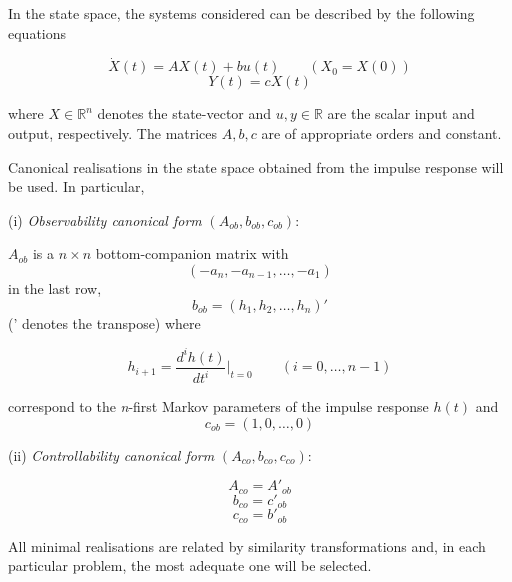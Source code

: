 \documentclass{article}
\begin{document}
In the state space, the systems considered can be described by the
following equations

\begin{equation*}
\dot{X}(t) = AX(t) + bu(t) \qquad (X_0 = X(0))
\end{equation*}
\begin{equation}\label{eq:3}
Y(t) = c X(t)
\end{equation}

where $X \in \mathbb{R}^n$ denotes the state-vector and $u, y \in
\mathbb{R}$ are the scalar input and output, respectively. The
matrices $A, b, c$ are of appropriate orders and constant.

Canonical realisations in the state space obtained from the
impulse response will be used. In particular,

(i) \textit{Observability canonical form} $(A_{ob}, b_{ob},
c_{ob})$:

$A_{ob}$ is a $n \times n$ bottom-companion matrix with
\begin{equation}\label{eq:4}
(-a_n,-a_{n-1}, \ldots, -a_1)
\end{equation}
in the last row,
\begin{equation}\label{eq:5}
b_{ob} = (h_1, h_2, \ldots, h_n)'
\end{equation}
(' denotes the transpose) where

\begin{equation}\label{eq:6}
h_{i+1} = \frac{d^ih(t)}{dt^i}\bigg |_{t=0} \qquad (i = 0, \ldots, n-1)
\end{equation}

correspond to the \textit{n}-first Markov parameters of the
impulse response $h(t)$ and
\begin{equation}\label{eq:7}
c_{ob}=(1, 0, \ldots, 0)
\end{equation}

(ii) \textit{Controllability canonical form} $(A_{co}, b_{co},
c_{co})$:

\begin{equation}\label{eq:8}
A_{co} = A'_{ob}
\end{equation}
\begin{equation}\label{eq:9}
b_{co} = c'_{ob}
\end{equation}
\begin{equation}\label{eq:10}
c_{co} = b'_{ob}
\end{equation}

All minimal realisations are related by similarity transformations
and, in each particular problem, the most adequate one will be
selected.
\end{document}
